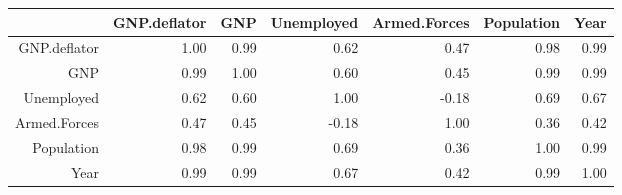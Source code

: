 \begin{table}[ht]
\centering
\begin{tabular}{rrrrrrr}
  \hline
 & GNP.deflator & GNP & Unemployed & Armed.Forces & Population & Year \\ 
  \hline
GNP.deflator & 1.00 & 0.99 & 0.62 & 0.47 & 0.98 & 0.99 \\ 
  GNP & 0.99 & 1.00 & 0.60 & 0.45 & 0.99 & 0.99 \\ 
  Unemployed & 0.62 & 0.60 & 1.00 & -0.18 & 0.69 & 0.67 \\ 
  Armed.Forces & 0.47 & 0.45 & -0.18 & 1.00 & 0.36 & 0.42 \\ 
  Population & 0.98 & 0.99 & 0.69 & 0.36 & 1.00 & 0.99 \\ 
  Year & 0.99 & 0.99 & 0.67 & 0.42 & 0.99 & 1.00 \\ 
   \hline
\end{tabular}
\end{table}
